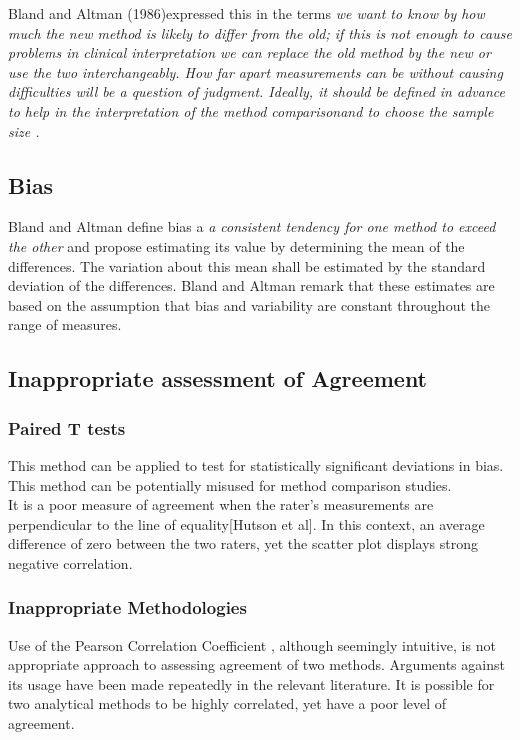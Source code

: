 \documentclass[Chap1main.tex]{subfiles}
\begin{document}
Bland and Altman (1986)expressed this in the terms \emph{we want
to know by how much the new method is likely to differ from the
old; if this is not enough to cause problems in clinical
interpretation we can replace the old method by the new or use the
two interchangeably. How far apart measurements can be without
causing difficulties will be a question of judgment. Ideally, it
should be defined in advance to help in the interpretation of the
method comparisonand to choose the sample size .}
\subsection{Bias}
Bland and Altman define bias a \emph{a consistent tendency for one
method to exceed the other} and propose estimating its value
by determining the mean of the differences. The variation about
this mean shall be estimated by the  standard deviation of the
differences. Bland and Altman remark that these estimates are based on the
assumption that bias and variability are constant throughout the
range of measures.
\subsection{Inappropriate assessment of Agreement}
\subsubsection{Paired T tests} This method can be applied to test for
statistically significant deviations in bias. This method can be
potentially misused for method comparison studies.
\\It is a poor measure of agreement when the rater's measurements
are perpendicular to the line of equality[Hutson et al]. In this
context, an average difference of zero between the two raters, yet
the scatter plot displays strong negative correlation.
\subsubsection{Inappropriate Methodologies} Use of the Pearson
Correlation Coefficient , although seemingly intuitive, is not
appropriate approach to assessing agreement of two methods.
Arguments against its usage have been made repeatedly in the
relevant literature. It is possible for two analytical methods to
be highly correlated, yet have a poor level of agreement.
\end{document}
